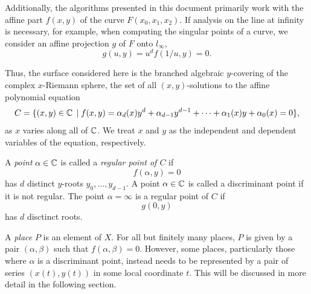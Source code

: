 Additionally, the algorithms presented in this document primarily work
with the affine part $f(x,y)$ of the curve $F(x_0,x_1,x_2)$. If analysis
on the line at infinity is necessary, for example, when computing the
singular points of a curve, we consider an affine projection $g$ of $F$
onto $l_\infty$,
\[
    g(u,y) = u^d f(1/u,y) = 0.
\]

Thus, the surface considered here is the branched algebraic $y$-covering
of the complex $x$-Riemann sphere, the set of all $(x,y)$-solutions to
the affine polynomial equation
\[
    C = \{ (x,y) \in \operatorname{\mathbb{C}} \; | \; f(x,y) = \alpha_d(x)y^d +
    \alpha_{d-1}y^{d-1} + \cdots + \alpha_1(x)y + \alpha_0(x) = 0\},
\]
as $x$ varies along all of $\operatorname{\mathbb{C}}$. We treat $x$ and $y$ as the
independent and dependent variables of the equation, respectively.

A {\it point} $\alpha \in \operatorname{\mathbb{C}}$ is called a {\it regular point of $C$} if
\[
    f(\alpha,y) = 0
\]
has $d$ distinct $y$-roots $y_0,\ldots,y_{d-1}$. A point $\alpha \in
\operatorname{\mathbb{C}}$ is called a discriminant point if it is not regular. The point
$\alpha = \infty$ is a regular point of $C$ if
\[
    g(0,y)
\]
has $d$ disctinct roots.

A {\it place} $P$ is an element of $X$. For all but finitely many
places, $P$ is given by a pair $(\alpha,\beta)$ such that
$f(\alpha,\beta) = 0$. However, some places, particularly those where
$\alpha$ is a discriminant point, instead needs to be represented by a
pair of series $(x(t),y(t))$ in some local coordinate $t$. This will be
discussed in more detail in the following section.
